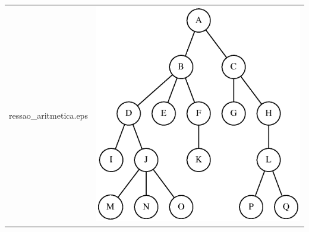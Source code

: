 \documentclass[aspectratio=169]{beamer}
\begin{document}
\begin{frame}[fragile]
\begin{enumerate}
\begin{tabular}{p{}p{}}
ressao_aritmetica.eps} & \includegraphics[height=0.55\paperheight]{imagens/arvore_e.eps}\\
\end{tabular}
\end{enumerate}
\end{frame}
\end{document}

